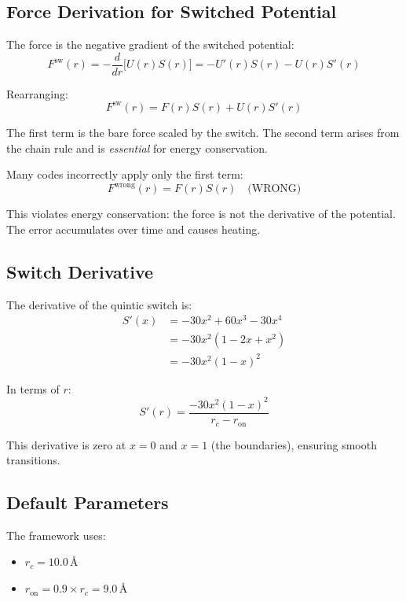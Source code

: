 \documentclass[11pt]{article}
\begin{document}
\subsection{Force Derivation for Switched Potential}

The force is the negative gradient of the switched potential:
\begin{equation}
F^{\text{sw}}(r) = -\frac{d}{dr}\bigl[U(r) S(r)\bigr] = -U'(r) S(r) - U(r) S'(r)
\end{equation}

Rearranging:
\begin{equation}
\boxed{F^{\text{sw}}(r) = F(r) S(r) + U(r) S'(r)}
\end{equation}

The first term is the bare force scaled by the switch. The second term arises from the chain rule and is \textit{essential} for energy conservation.

Many codes incorrectly apply only the first term:
\begin{equation}
F^{\text{wrong}}(r) = F(r) S(r) \quad \text{(WRONG)}
\end{equation}

This violates energy conservation: the force is not the derivative of the potential. The error accumulates over time and causes heating.

\subsection{Switch Derivative}

The derivative of the quintic switch is:
\begin{align}
S'(x) &= -30x^2 + 60x^3 - 30x^4 \\
&= -30x^2(1 - 2x + x^2) \\
&= -30x^2(1-x)^2
\end{align}

In terms of $r$:
\begin{equation}
S'(r) = \frac{-30x^2(1-x)^2}{r_c - r_{\text{on}}}
\end{equation}

This derivative is zero at $x = 0$ and $x = 1$ (the boundaries), ensuring smooth transitions.

\subsection{Default Parameters}

The framework uses:
\begin{itemize}
\item $r_c = 10.0$\,\AA
\item $r_{\text{on}} = 0.9 \times r_c = 9.0$\,\AA
\end{itemize}
\end{document}

